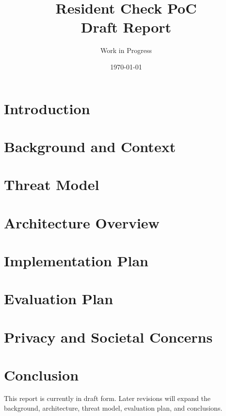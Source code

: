 \documentclass[11pt,a4paper]{report}
\title{Resident Check PoC\\[0.5em]\large Draft Report}
\author{Work in Progress}
\date{\today}
\begin{document}
\maketitle
\tableofcontents

\chapter{Introduction}



\chapter{Background and Context}
% 

\chapter{Threat Model}
% 

\chapter{Architecture Overview}
% 

\chapter{Implementation Plan}
% 

\chapter{Evaluation Plan}
% 

\chapter{Privacy and Societal Concerns}
% 

\chapter{Conclusion}
This report is currently in draft form. Later revisions will expand the background, architecture, threat model, evaluation plan, and conclusions.
\end{document}
